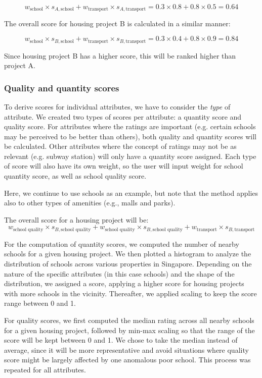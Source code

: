 \documentclass[a4paper, 11pt]{article}
\begin{document}
\[ w_{\text{school}} \times s_{A,\text{school}} + w_{\text{transport}} \times s_{A,\text{transport}} = 0.3 \times 0.8 + 0.8 \times 0.5 = 0.64 \]

The overall score for housing project B is calculated in a similar manner:

    \[ w_{\text{school}} \times s_{B,\text{school}} + w_{\text{transport}} \times s_{B,\text{transport}} = 0.3 \times 0.4 + 0.8 \times 0.9 = 0.84 \]

Since housing project B has a higher score, this will be ranked higher than project A.

\subsubsection{Quality and quantity scores}

To derive scores for individual attributes, we have to consider the \textit{type} of attribute. We created two types of scores per attribute: a quantity score and quality score.  For attributes where the ratings are important (e.g. certain schools may be perceived to be better than others), both quality and quantity scores will be calculated. Other attributes where the concept of ratings may not be as relevant (e.g. subway station) will only have a quantity score assigned. Each type of score will also have its own weight, so the user will input weight for school quantity score, as well as school quality score. 

Here, we continue to use schools as an example, but note that the method applies also to other types of amenities (e.g., malls and parks).

The overall score for a housing project will be: \[ w_{\text{school quality}} \times s_{B,\text{school quality}} + w_{\text{school quality}} \times s_{B,\text{school quality}} + w_{\text{transport}} \times s_{B,\text{transport}} \]

For the computation of quantity scores, we computed the number of nearby schools for a given housing project. We then plotted a histogram to analyze the distribution of schools across various properties in Singapore. Depending on the nature of the specific attributes (in this case schools) and the shape of the distribution, we assigned a score, applying a higher score for housing projects with more schools in the vicinity. Thereafter, we applied scaling to keep the score range between 0 and 1. 

For quality scores, we first computed the median rating across all nearby schools for a given housing project, followed by min-max scaling so that the range of the score will be kept between 0 and 1. We chose to take the median instead of average, since it will be more representative and avoid situations where quality score might be largely affected by one anomalous poor school. This process was repeated for all attributes.
\end{document}
